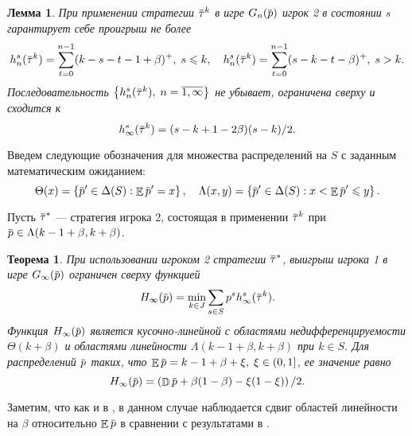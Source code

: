 \documentclass[12pt, draft]{extarticle}
\newtheorem{lemma}{Лемма}
\newtheorem{theorem}{Теорема}
\newcommand{\overbar}[1]%
{\mkern 1.5mu\overline{\mkern-1.3mu#1\mkern-1.3mu}\mkern 1.3mu}
\newcommand{\p}{\ensuremath{\overbar{p}}}
\DeclareMathOperator{\E}{\mathbb{E}}
\DeclareMathOperator{\D}{\mathbb{D}}
\newcommand{\G}[1][n]{\ensuremath{G_{#1}}}
\newcommand{\High}[1][\ensuremath{\infty}]{\ensuremath{H_{#1}}}
\newcommand{\tauv}{\ensuremath{\overbar{\tau}}}
\begin{document}
\begin{lemma}
  \label{upper-bound:lemma:vector-payoffs}
  При применении стратегии $\tauv^k$ в игре $\G(\p)$ игрок 2 в состоянии $s$
  гарантирует себе проигрыш не более
  \begin{gather*}
    h^s_n(\tauv^k) = \sum_{t=0}^{n-1} (k-s-t-1+\beta)^+, \; s \leqslant k, \quad
    h^s_n(\tauv^k) = \sum_{t=0}^{n-1} (s-k-t-\beta)^+, \; s > k.
  \end{gather*}
  Последовательность $\left\{ h^s_n(\tauv^k), \; n = \overline{1, \infty}
  \right\}$ не убывает, ограничена сверху и сходится к %
  \begin{equation}
    \label{upper-bound:eq:max-payoff}
    h^s_\infty(\tauv^k) = (s - k + 1 - 2\beta)(s-k)/2.
  \end{equation}
\end{lemma}

Введем следующие обозначения для множества распределений на $S$ с заданным
математическим ожиданием:
\begin{equation*}
  \Theta(x) = \left\{ \p' \in \Delta(S): \E \p' = x \right\}, \quad
  \Lambda(x, y) = \left\{ \p' \in \Delta(S): x < \E \p' \leqslant y \right\}.
\end{equation*}

Пусть $\tauv^*$ --- стратегия игрока 2, состоящая в применении $\tauv^k$ при $\p
\in \Lambda(k-1+\beta,k+\beta)$.

\begin{theorem}
  \label{upper-bound:theorem}
  При использовании игроком 2 стратегии $\tauv^*$, выигрыш игрока 1 в игре
  $\G[\infty](\p)$ ограничен сверху функцией
  \begin{equation*}
    \High(\p) = \min_{k \in J} \sum_{s \in S} p^s  h^s_\infty(\tauv^k).
  \end{equation*}
  Функция $\High(\p)$ является кусочно-линейной с областями недифференцируемости
  $\Theta(k+\beta)$ и областями линейности $\Lambda(k - 1 + \beta, k + \beta)$
  при $k \in S$. Для распределений $\p$ таких, что $\E \p = k - 1 + \beta + \xi,
  \; \xi \in (0, 1]$, ее значение равно
  \begin{equation}
    \label{upper-bound:eq:H(p)}
    \High(\p) = \left( \D \p + \beta(1-\beta) - \xi(1-\xi) \right)/2.
  \end{equation}
\end{theorem}
Заметим, что как и в \cite{bib:pyanykh16}, в данном случае наблюдается сдвиг
областей линейности на $\beta$ относительно $\E \p$ в сравнении с результатами в
\cite{bib:domansky11}.
\end{document}
